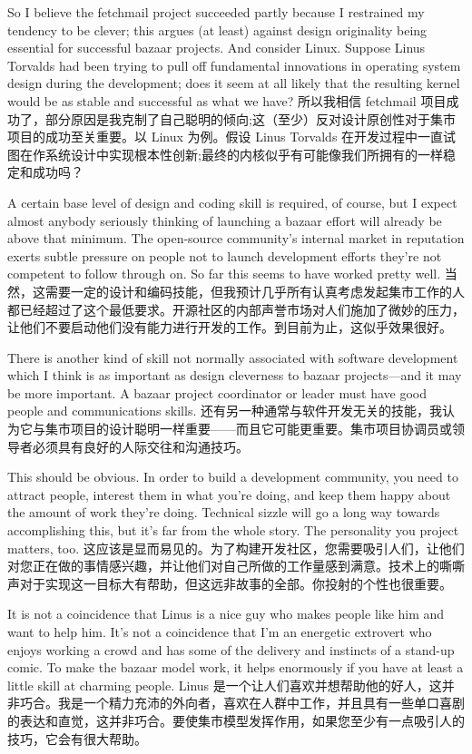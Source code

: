 \documentclass[a4paper,12pt,UTF8,twoside]{ctexbook}
\begin{document}
So I believe the fetchmail project succeeded partly because I restrained my tendency to be clever; this argues (at least) against design originality being essential for successful bazaar projects. And consider Linux. Suppose Linus Torvalds had been trying to pull off fundamental innovations in operating system design during the development; does it seem at all likely that the resulting kernel would be as stable and successful as what we have?
所以我相信 fetchmail 项目成功了，部分原因是我克制了自己聪明的倾向;这（至少）反对设计原创性对于集市项目的成功至关重要。以 Linux 为例。假设 Linus Torvalds 在开发过程中一直试图在作系统设计中实现根本性创新;最终的内核似乎有可能像我们所拥有的一样稳定和成功吗？

A certain base level of design and coding skill is required, of course, but I expect almost anybody seriously thinking of launching a bazaar effort will already be above that minimum. The open-source community's internal market in reputation exerts subtle pressure on people not to launch development efforts they're not competent to follow through on. So far this seems to have worked pretty well.
当然，这需要一定的设计和编码技能，但我预计几乎所有认真考虑发起集市工作的人都已经超过了这个最低要求。开源社区的内部声誉市场对人们施加了微妙的压力，让他们不要启动他们没有能力进行开发的工作。到目前为止，这似乎效果很好。

There is another kind of skill not normally associated with software development which I think is as important as design cleverness to bazaar projects—and it may be more important. A bazaar project coordinator or leader must have good people and communications skills.
还有另一种通常与软件开发无关的技能，我认为它与集市项目的设计聪明一样重要——而且它可能更重要。集市项目协调员或领导者必须具有良好的人际交往和沟通技巧。

This should be obvious. In order to build a development community, you need to attract people, interest them in what you're doing, and keep them happy about the amount of work they're doing. Technical sizzle will go a long way towards accomplishing this, but it's far from the whole story. The personality you project matters, too.
这应该是显而易见的。为了构建开发社区，您需要吸引人们，让他们对您正在做的事情感兴趣，并让他们对自己所做的工作量感到满意。技术上的嘶嘶声对于实现这一目标大有帮助，但这远非故事的全部。你投射的个性也很重要。

It is not a coincidence that Linus is a nice guy who makes people like him and want to help him. It's not a coincidence that I'm an energetic extrovert who enjoys working a crowd and has some of the delivery and instincts of a stand-up comic. To make the bazaar model work, it helps enormously if you have at least a little skill at charming people.
Linus 是一个让人们喜欢并想帮助他的好人，这并非巧合。我是一个精力充沛的外向者，喜欢在人群中工作，并且具有一些单口喜剧的表达和直觉，这并非巧合。要使集市模型发挥作用，如果您至少有一点吸引人的技巧，它会有很大帮助。
\end{document}
